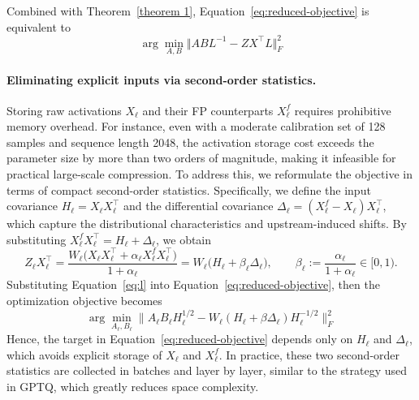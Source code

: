 Combined with Theorem~\ref{theorem 1}, Equation~\ref{eq:reduced-objective} is equivalent to
\begin{equation}
    \arg\min_{A,B} \Vert ABL^{-1}-ZX^{\top}L\Vert_F^2
\label{eq:l}
\end{equation}
    
\paragraph{Eliminating explicit inputs via second-order statistics.} Storing raw activations $X_\ell$ and their FP counterparts $X_\ell^f$ requires prohibitive memory overhead. For instance, even with a moderate calibration set of 128 samples and sequence length 2048, the activation storage cost exceeds the parameter size by more than two orders of magnitude, making it infeasible for practical large-scale compression. To address this, we reformulate the objective in terms of compact second-order statistics. Specifically, we define the input covariance $H_\ell = X_\ell X_\ell^\top$ and the differential covariance $\Delta_\ell = (X_\ell^f - X_\ell)X_\ell^\top$, which capture the distributional characteristics and upstream-induced shifts. By substituting $X_\ell^f X_\ell^\top = H_\ell + \Delta_\ell$, we obtain
\begin{equation}
Z_\ell X_\ell^\top
=
\frac{W_\ell \big(X_\ell X_\ell^\top + \alpha_\ell X_\ell^f X_\ell^\top\big)}{1+\alpha_\ell}
=
W_\ell\Big(H_\ell + \beta_\ell \Delta_\ell\Big),
\qquad
\beta_\ell := \frac{\alpha_\ell}{1+\alpha_\ell}\in[0,1).
\label{eq:ZXt-stat}
\end{equation}
Substituting Equation~\ref{eq:l} into Equation~\ref{eq:reduced-objective}, then the optimization objective becomes
\begin{equation}
\arg\min_{A_\ell,B_\ell }\|A_\ell B_\ell H_\ell^{1/2}-W_\ell(H_\ell+\beta \Delta_\ell)H_{\ell}^{-1/2}\|_F^2
\label{eq:final}
\end{equation}
Hence, the target in Equation~\ref{eq:reduced-objective} depends only on $H_\ell$ and $\Delta_\ell$, which avoids explicit storage of $X_\ell$ and $X_\ell^f$. In practice, these two second-order statistics are collected in batches and layer by layer, similar to the strategy used in GPTQ, which greatly reduces space complexity.

